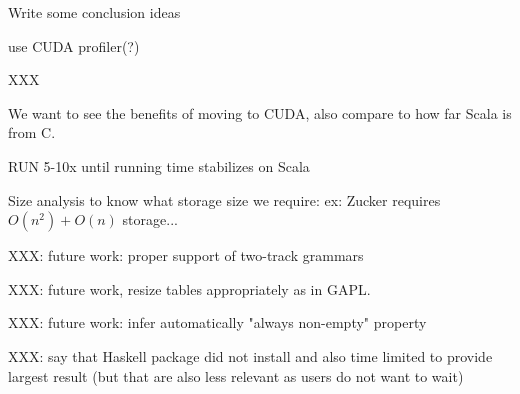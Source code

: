 {\color{red}\ol
\item Write some conclusion ideas
\item use CUDA profiler(?)
\ole}

XXX

{\color{red} We want to see the benefits of moving to CUDA, also compare to how far Scala is from C.}

RUN 5-10x until running time stabilizes on Scala

 {\color{red} Size analysis to know what storage size we require: ex: Zucker requires $O(n^2)+O(n)$ storage...}

XXX: future work: proper support of two-track grammars

XXX: future work, resize tables appropriately as in GAPL.

XXX: future work: infer automatically "always non-empty" property

{\color{red} XXX: say that Haskell package did not install and also time limited to provide largest result (but that are also less relevant as users do not want to wait)}

%
